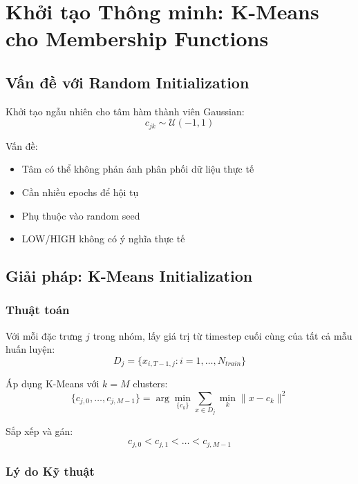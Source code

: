 \documentclass[12pt,a4paper]{article}
\begin{document}
\section{Khởi tạo Thông minh: K-Means cho Membership Functions}

\subsection{Vấn đề với Random Initialization}

Khởi tạo ngẫu nhiên cho tâm hàm thành viên Gaussian:
\begin{equation}
c_{jk} \sim \mathcal{U}(-1, 1)
\end{equation}

Vấn đề:
\begin{itemize}
    \item Tâm có thể không phản ánh phân phối dữ liệu thực tế
    \item Cần nhiều epochs để hội tụ
    \item Phụ thuộc vào random seed
    \item LOW/HIGH không có ý nghĩa thực tế
\end{itemize}

\subsection{Giải pháp: K-Means Initialization}

\subsubsection{Thuật toán}

Với mỗi đặc trưng $j$ trong nhóm, lấy giá trị từ timestep cuối cùng của tất cả mẫu huấn luyện:
\begin{equation}
D_j = \{x_{i,T-1,j} : i = 1, \ldots, N_{train}\}
\end{equation}

Áp dụng K-Means với $k=M$ clusters:
\begin{equation}
\{c_{j,0}, \ldots, c_{j,M-1}\} = \arg\min_{\{c_k\}} \sum_{x \in D_j} \min_{k} \|x - c_k\|^2
\end{equation}

Sắp xếp và gán:
\begin{equation}
c_{j,0} < c_{j,1} < \ldots < c_{j,M-1}
\end{equation}

\subsubsection{Lý do Kỹ thuật}
\end{document}
